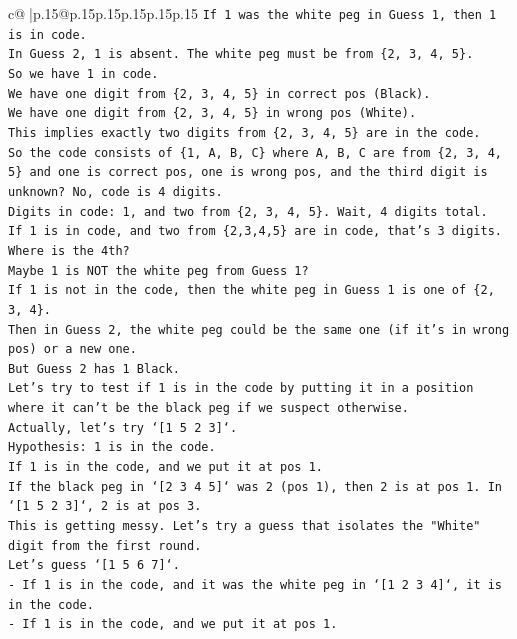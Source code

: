 \documentclass{article}
\begin{document}
{\begin{supertabular}{c@{$\;$}|p{.15\linewidth}@{}p{.15\linewidth}p{.15\linewidth}p{.15\linewidth}p{.15\linewidth}p{.15\linewidth}}
{{{\texttt{If 1 was the white peg in Guess 1, then 1 is in code.} \\
\texttt{In Guess 2, 1 is absent. The white peg must be from \{2, 3, 4, 5\}.} \\
\texttt{So we have 1 in code.} \\
\texttt{We have one digit from \{2, 3, 4, 5\} in correct pos (Black).} \\
\texttt{We have one digit from \{2, 3, 4, 5\} in wrong pos (White).} \\
\texttt{This implies exactly two digits from \{2, 3, 4, 5\} are in the code.} \\
\texttt{So the code consists of \{1, A, B, C\} where A, B, C are from \{2, 3, 4, 5\} and one is correct pos, one is wrong pos, and the third digit is unknown? No, code is 4 digits.} \\
\texttt{Digits in code: 1, and two from \{2, 3, 4, 5\}. Wait, 4 digits total.} \\
\texttt{If 1 is in code, and two from \{2,3,4,5\} are in code, that's 3 digits. Where is the 4th?} \\
\texttt{Maybe 1 is NOT the white peg from Guess 1?} \\
\texttt{If 1 is not in the code, then the white peg in Guess 1 is one of \{2, 3, 4\}.} \\
\texttt{Then in Guess 2, the white peg could be the same one (if it's in wrong pos) or a new one.} \\
\texttt{But Guess 2 has 1 Black.} \\
\texttt{Let's try to test if 1 is in the code by putting it in a position where it can't be the black peg if we suspect otherwise.} \\
\texttt{Actually, let's try `{[}1 5 2 3{]}`.} \\
\texttt{Hypothesis: 1 is in the code.} \\
\texttt{If 1 is in the code, and we put it at pos 1.} \\
\texttt{If the black peg in `{[}2 3 4 5{]}` was 2 (pos 1), then 2 is at pos 1. In `{[}1 5 2 3{]}`, 2 is at pos 3.} \\
\texttt{This is getting messy. Let's try a guess that isolates the "White" digit from the first round.} \\
\texttt{Let's guess `{[}1 5 6 7{]}`.} \\
\texttt{{-} If 1 is in the code, and it was the white peg in `{[}1 2 3 4{]}`, it is in the code.} \\
\texttt{{-} If 1 is in the code, and we put it at pos 1.} \\
}}}
\end{supertabular}}
\end{document}
